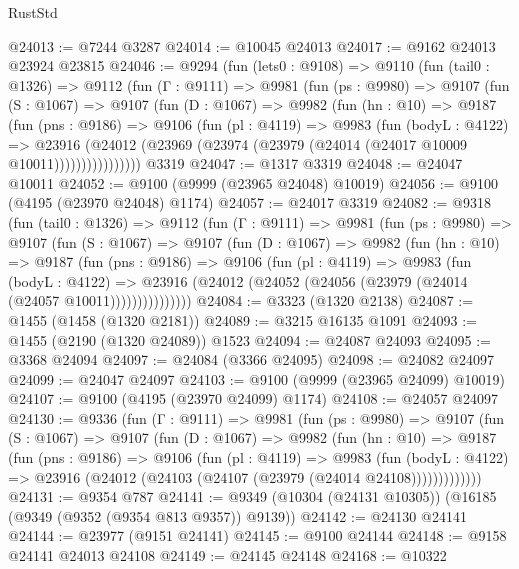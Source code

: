 \begin{lexlean}{RustStd}
\begin{coremodule}
@24013 := @7244 @3287
@24014 := @10045 @24013
@24017 := @9162 @24013 @23924 @23815
@24046 := @9294
    (fun (lets0 : @9108) =>
    @9110
      (fun (tail0 : @1326) =>
      @9112
        (fun (Γ : @9111) =>
        @9981
          (fun (ps : @9980) =>
          @9107
            (fun (S : @1067) =>
            @9107
              (fun (D : @1067) =>
              @9982
                (fun (hn : @10) =>
                @9187
                  (fun (pns : @9186) =>
                  @9106
                    (fun (pl : @4119) =>
                    @9983
                      (fun (bodyL : @4122) =>
                      @23916
                        (@24012
                          (@23969 (@23974 (@23979 (@24014 (@24017 @10009 @10011))))))))))))))))
    @3319
@24047 := @1317 @3319
@24048 := @24047 @10011
@24052 := @9100 (@9999 (@23965 @24048) @10019)
@24056 := @9100 (@4195 (@23970 @24048) @1174)
@24057 := @24017 @3319
@24082 := @9318
    (fun (tail0 : @1326) =>
    @9112
      (fun (Γ : @9111) =>
      @9981
        (fun (ps : @9980) =>
        @9107
          (fun (S : @1067) =>
          @9107
            (fun (D : @1067) =>
            @9982
              (fun (hn : @10) =>
              @9187
                (fun (pns : @9186) =>
                @9106
                  (fun (pl : @4119) =>
                  @9983
                    (fun (bodyL : @4122) =>
                    @23916 (@24012 (@24052 (@24056 (@23979 (@24014 (@24057 @10011)))))))))))))))
@24084 := @3323 (@1320 @2138)
@24087 := @1455 (@1458 (@1320 @2181))
@24089 := @3215 @16135 @1091
@24093 := @1455 (@2190 (@1320 @24089)) @1523
@24094 := @24087 @24093
@24095 := @3368 @24094
@24097 := @24084 (@3366 @24095)
@24098 := @24082 @24097
@24099 := @24047 @24097
@24103 := @9100 (@9999 (@23965 @24099) @10019)
@24107 := @9100 (@4195 (@23970 @24099) @1174)
@24108 := @24057 @24097
@24130 := @9336
    (fun (Γ : @9111) =>
    @9981
      (fun (ps : @9980) =>
      @9107
        (fun (S : @1067) =>
        @9107
          (fun (D : @1067) =>
          @9982
            (fun (hn : @10) =>
            @9187
              (fun (pns : @9186) =>
              @9106
                (fun (pl : @4119) =>
                @9983
                  (fun (bodyL : @4122) =>
                  @23916 (@24012 (@24103 (@24107 (@23979 (@24014 @24108)))))))))))))
@24131 := @9354 @787
@24141 := @9349 (@10304 (@24131 @10305)) (@16185 (@9349 (@9352 (@9354 @813 @9357)) @9139))
@24142 := @24130 @24141
@24144 := @23977 (@9151 @24141)
@24145 := @9100 @24144
@24148 := @9158 @24141 @24013 @24108
@24149 := @24145 @24148
@24168 := @10322

\end{coremodule}
\end{lexlean}
